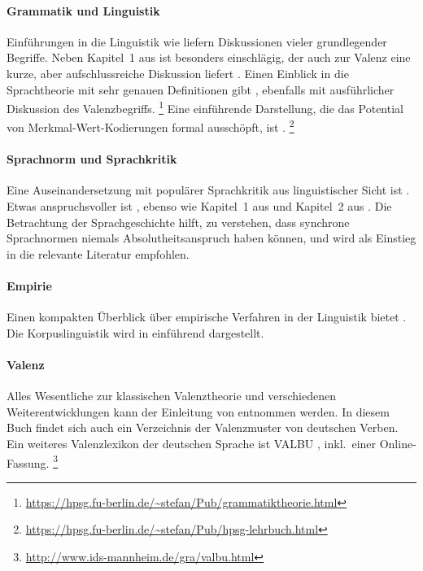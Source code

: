 \begin{sloppypar}

\paragraph*{Grammatik und Linguistik}

Einführungen in die Linguistik wie \citet{EgL07} liefern Diskussionen vieler grundlegender Begriffe.
Neben Kapitel~1 aus \citet{Eisenberg1} ist \citet{Engel09} besonders einschlägig, der auch zur Valenz eine kurze, aber aufschlussreiche Diskussion liefert \citep[70--73]{Engel09}.
Einen Einblick in die Sprachtheorie mit sehr genauen Definitionen gibt \citet{Mueller10}, ebenfalls mit ausführlicher Diskussion des Valenzbegriffs.%
\footnote{\url{https://hpsg.fu-berlin.de/~stefan/Pub/grammatiktheorie.html}}
Eine einführende Darstellung, die das Potential von Merkmal-Wert-Kodierungen formal ausschöpft, ist \citet{Mueller08}.%
\footnote{\url{https://hpsg.fu-berlin.de/~stefan/Pub/hpsg-lehrbuch.html}}

\paragraph*{Sprachnorm und Sprachkritik}

Eine Auseinandersetzung mit populärer Sprachkritik aus linguistischer Sicht ist \citet{Meinunger08}.
Etwas anspruchsvoller ist \citet{Eisenberg08}, ebenso wie Kapitel~1 aus \citet{Eisenberg1} und Kapitel~2 aus \citet{Eisenberg2}.
Die Betrachtung der Sprachgeschichte hilft, zu verstehen, dass synchrone Sprachnormen niemals Absolutheitsanspruch haben können, und \citet{NueblingEa2010} wird als Einstieg in die relevante Literatur empfohlen.

\paragraph*{Empirie}

Einen kompakten Überblick über empirische Verfahren in der Linguistik bietet \citet{Albert07}.
Die Korpuslinguistik wird in \citet{Perkuhn-ea2012} einführend dargestellt.

\paragraph*{Valenz}

Alles Wesentliche zur klassischen Valenztheorie und verschiedenen Weiterentwicklungen kann der Einleitung von \citet{HS91} entnommen werden.
In diesem Buch findet sich auch ein Verzeichnis der Valenzmuster von deutschen Verben.
Ein weiteres Valenzlexikon der deutschen Sprache ist VALBU \citep{Valbu}, inkl.\ einer Online-Fassung.%
\footnote{\url{http://www.ids-mannheim.de/gra/valbu.html}}

\end{sloppypar}
